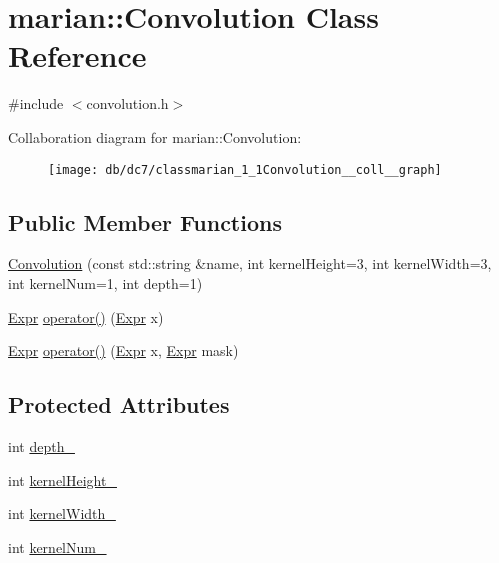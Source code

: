 \hypertarget{classmarian_1_1Convolution}{}\section{marian\+:\+:Convolution Class Reference}
\label{classmarian_1_1Convolution}


{\ttfamily \#include $<$convolution.\+h$>$}



Collaboration diagram for marian\+:\+:Convolution\+:
\nopagebreak
\begin{figure}[H]
\begin{center}
\leavevmode
\texttt{[image: db/dc7/classmarian\_1\_1Convolution\_\_coll\_\_graph]}
\end{center}
\end{figure}
\subsection*{Public Member Functions}
\begin{DoxyCompactItemize}
\item 
\hyperlink{classmarian_1_1Convolution_a7ec673f9c5d0af080721411152f5f944}{Convolution} (const std\+::string \&name, int kernel\+Height=3, int kernel\+Width=3, int kernel\+Num=1, int depth=1)
\item 
\hyperlink{namespacemarian_a498d8baf75b754011078b890b39c8e12}{Expr} \hyperlink{classmarian_1_1Convolution_ac5755a44695ec454ca80d8f309a20e80}{operator()} (\hyperlink{namespacemarian_a498d8baf75b754011078b890b39c8e12}{Expr} x)
\item 
\hyperlink{namespacemarian_a498d8baf75b754011078b890b39c8e12}{Expr} \hyperlink{classmarian_1_1Convolution_a81e17c2e8691fb6bcb922343e797a23a}{operator()} (\hyperlink{namespacemarian_a498d8baf75b754011078b890b39c8e12}{Expr} x, \hyperlink{namespacemarian_a498d8baf75b754011078b890b39c8e12}{Expr} mask)
\end{DoxyCompactItemize}
\subsection*{Protected Attributes}
\begin{DoxyCompactItemize}
\item 
int \hyperlink{classmarian_1_1Convolution_a10d9391dababa5ca35ada157ba4974ee}{depth\+\_\+}
\item 
int \hyperlink{classmarian_1_1Convolution_aa2e7a504274fbe1bd24fce5fe89d6ff7}{kernel\+Height\+\_\+}
\item 
int \hyperlink{classmarian_1_1Convolution_a4b65ffe7fe84099465ecf6e0e402f4aa}{kernel\+Width\+\_\+}
\item 
int \hyperlink{classmarian_1_1Convolution_aaf7c9a32c5b843d261548abcedd2f25d}{kernel\+Num\+\_\+}
\end{DoxyCompactItemize}
